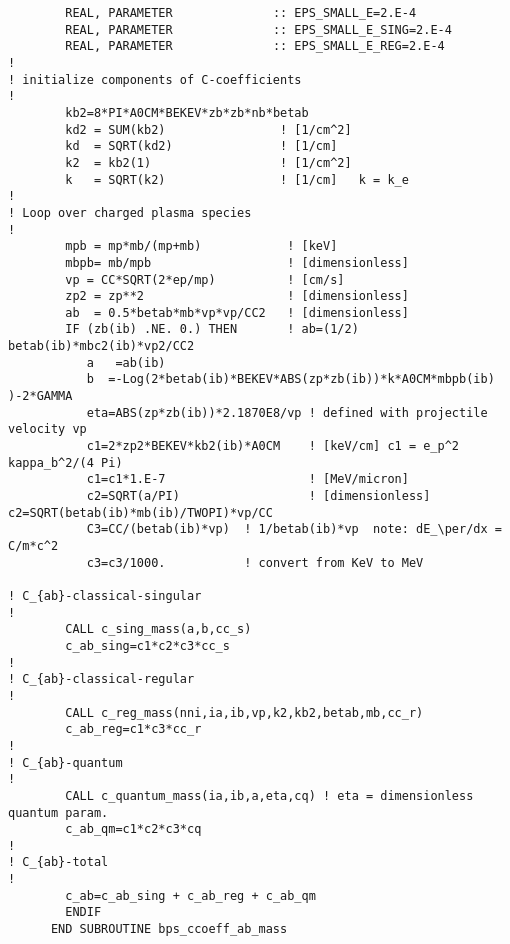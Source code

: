 \documentclass[preprint,12pt,eqsecnum,nofootinbib,amsmath,amssymb]{revtex4}
\begin{document}
{\begin{verbatim}
        REAL, PARAMETER              :: EPS_SMALL_E=2.E-4
        REAL, PARAMETER              :: EPS_SMALL_E_SING=2.E-4
        REAL, PARAMETER              :: EPS_SMALL_E_REG=2.E-4
!
! initialize components of C-coefficients
!
        kb2=8*PI*A0CM*BEKEV*zb*zb*nb*betab
        kd2 = SUM(kb2)                ! [1/cm^2]
        kd  = SQRT(kd2)               ! [1/cm]
        k2  = kb2(1)                  ! [1/cm^2]
        k   = SQRT(k2)                ! [1/cm]   k = k_e
!
! Loop over charged plasma species
!
        mpb = mp*mb/(mp+mb)            ! [keV]
        mbpb= mb/mpb                   ! [dimensionless]
        vp = CC*SQRT(2*ep/mp)          ! [cm/s]
        zp2 = zp**2                    ! [dimensionless]
        ab  = 0.5*betab*mb*vp*vp/CC2   ! [dimensionless] 
        IF (zb(ib) .NE. 0.) THEN       ! ab=(1/2) betab(ib)*mbc2(ib)*vp2/CC2
           a   =ab(ib)
           b  =-Log(2*betab(ib)*BEKEV*ABS(zp*zb(ib))*k*A0CM*mbpb(ib) )-2*GAMMA
           eta=ABS(zp*zb(ib))*2.1870E8/vp ! defined with projectile velocity vp
           c1=2*zp2*BEKEV*kb2(ib)*A0CM    ! [keV/cm] c1 = e_p^2 kappa_b^2/(4 Pi)
           c1=c1*1.E-7                    ! [MeV/micron]  
           c2=SQRT(a/PI)                  ! [dimensionless] c2=SQRT(betab(ib)*mb(ib)/TWOPI)*vp/CC
           C3=CC/(betab(ib)*vp)  ! 1/betab(ib)*vp  note: dE_\per/dx = C/m*c^2
           c3=c3/1000.           ! convert from KeV to MeV
   
! C_{ab}-classical-singular 
!
        CALL c_sing_mass(a,b,cc_s) 
        c_ab_sing=c1*c2*c3*cc_s
!
! C_{ab}-classical-regular 
!
        CALL c_reg_mass(nni,ia,ib,vp,k2,kb2,betab,mb,cc_r)
        c_ab_reg=c1*c3*cc_r
!
! C_{ab}-quantum
!
        CALL c_quantum_mass(ia,ib,a,eta,cq) ! eta = dimensionless quantum param.
        c_ab_qm=c1*c2*c3*cq
!
! C_{ab}-total
!
        c_ab=c_ab_sing + c_ab_reg + c_ab_qm
        ENDIF
      END SUBROUTINE bps_ccoeff_ab_mass
\end{verbatim}
}
\end{document}
